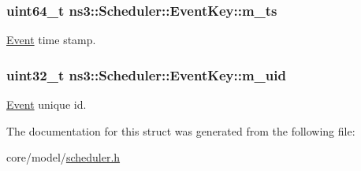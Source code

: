 \subsubsection[{\texorpdfstring{m\+\_\+ts}{m_ts}}]{\setlength{\rightskip}{0pt plus 5cm}uint64\+\_\+t ns3\+::\+Scheduler\+::\+Event\+Key\+::m\+\_\+ts}\hypertarget{structns3_1_1Scheduler_1_1EventKey_a5ba9eda880f52483aeead131810d0fcf}{}\label{structns3_1_1Scheduler_1_1EventKey_a5ba9eda880f52483aeead131810d0fcf}
\hyperlink{structns3_1_1Scheduler_1_1Event}{Event} time stamp. 
\subsubsection[{\texorpdfstring{m\+\_\+uid}{m_uid}}]{\setlength{\rightskip}{0pt plus 5cm}uint32\+\_\+t ns3\+::\+Scheduler\+::\+Event\+Key\+::m\+\_\+uid}\hypertarget{structns3_1_1Scheduler_1_1EventKey_aae8993764a7814eae2e89e709d36444c}{}\label{structns3_1_1Scheduler_1_1EventKey_aae8993764a7814eae2e89e709d36444c}
\hyperlink{structns3_1_1Scheduler_1_1Event}{Event} unique id. 

The documentation for this struct was generated from the following file\+:\begin{DoxyCompactItemize}
\item 
core/model/\hyperlink{scheduler_8h}{scheduler.\+h}\end{DoxyCompactItemize}
